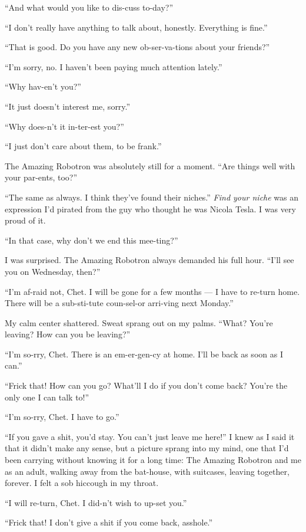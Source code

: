 ``And what would you like to dis-cuss to-day?''

``I don't really have anything to talk about, honestly. Everything is fine.''

``That is good. Do you have any new ob-ser-va-tions about your friends?''

``I'm sorry, no. I haven't been paying much attention lately.''

``Why hav-en't you?''

``It just doesn't interest me, sorry.''

``Why does-n't it in-ter-est you?''

``I just don't care about them, to be frank.''

The Amazing Robotron was absolutely still for a moment.
``Are things well with your par-ents, too?''

``The same as always. I think they've found their niches.''
\emph{Find your niche} was an expression I'd pirated from the guy
who thought he was Nicola Tesla. I was very proud of it.

``In that case, why don't we end this mee-ting?''

I was surprised. The Amazing Robotron always demanded his full
hour. ``I'll see you on Wednesday, then?''

``I'm af-raid not, Chet. I will be gone for a few months --- I have to re-turn 
home. There will be a sub-sti-tute coun-sel-or arri-ving next Monday.''

My calm center shattered. Sweat sprang out on my palms.
``What? You're leaving? How can you be leaving?''

``I'm so-rry, Chet. There is an em-er-gen-cy at home. I'll be back as soon as I 
can.''

``Frick that! How can you go? What'll I do if you don't come back? You're the 
only one I can talk to!''

``I'm so-rry, Chet. I have to go.''

``If you gave a shit, you'd stay. You can't just leave me here!'' I
knew as I said it that it didn't make any sense, but a picture
sprang into my mind, one that I'd been carrying without knowing it
for a long time: The Amazing Robotron and me as an adult, walking
away from the bat-house, with suitcases, leaving together, forever.
I felt a sob hiccough in my throat.

``I will re-turn, Chet. I did-n't wish to up-set you.''

``Frick that! I don't give a shit if you come back, asshole.''

